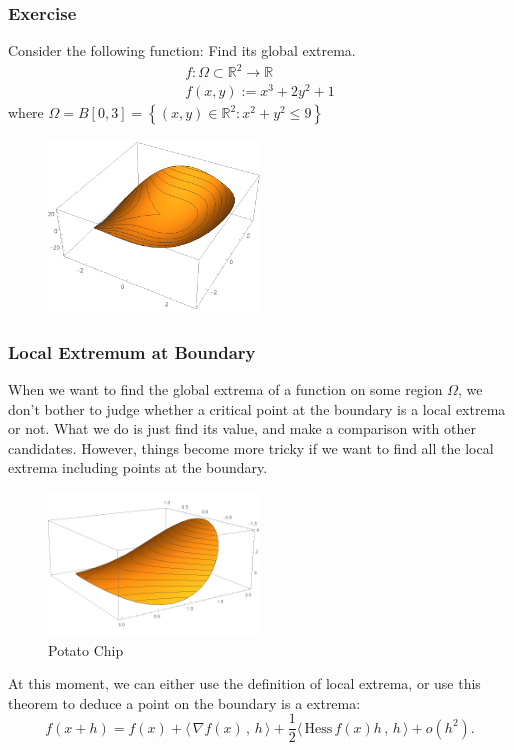 \documentclass[11pt, t]{beamer}
\newcommand{\scp}[2]{\langle\,#1\,,\,#2\,\rangle} \newcommand{\scpp}{\langle\,\cdot\,,\,\cdot\,\rangle}
\begin{document}
\begin{frame}
    \frametitle{Exercise}
    Consider the following function:
    Find its global extrema.
    \[
        \begin{array}{c}
            f: \Omega \subset \mathbb{R}^{2} \rightarrow \mathbb{R} \\
            f(x, y):=x^{3}+2 y^{2}+1
        \end{array}
    \]
    where $\Omega=B[0,3]=\left\{(x, y) \in \mathbb{R}^{2}: x^{2}+y^{2} \leq 9\right\}$

    \pause

    \begin{figure}[H]
        \centering
        \includegraphics[width=0.5\textwidth]{Figures/2020-07-29-15-52-27.png}
    \end{figure}
\end{frame}

\begin{frame}[allowframebreaks]
    \frametitle{Local Extremum at Boundary}
    When we want to find the global extrema of a function on some region $\Omega$, we don't bother to judge whether a critical point at the boundary is a local extrema or not. What we do is just find its value, and make a comparison with other candidates. However, things become more tricky if we want to find all the local extrema including points at the boundary.
    \begin{figure}[H]
        \centering
        \includegraphics[width=0.5\textwidth]{Figures/2020-07-29-15-28-47.png}
        \caption{Potato Chip}
    \end{figure}

    \newpage
    At this moment, we can either use the definition of local extrema, or use this theorem to deduce a point on the boundary is a extrema:
    $$
        f(x+h)=f(x)+\scp{\nabla f(x)}{h}+\frac{1}{2}\scp{\text{Hess}\,f(x)h}{h}+o(h^2).
    $$

\end{frame}
\end{document}
